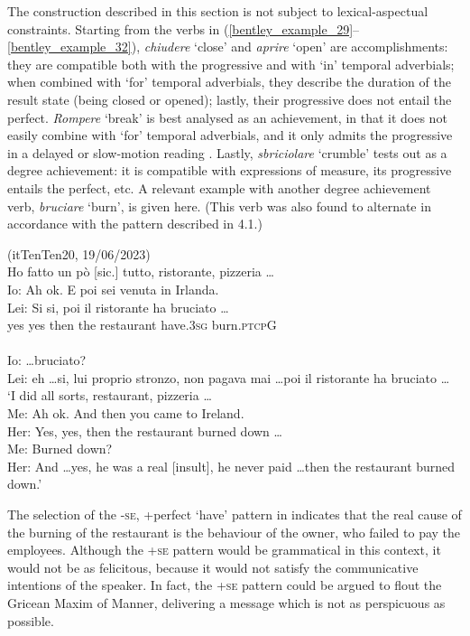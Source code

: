 \documentclass[output=paper,colorlinks,citecolor=brown
]{langscibook}
\begin{document}
The construction described in this section is not subject to lexical-aspectual constraints. Starting from the verbs in (\ref{bentley_example_29}--\ref{bentley_example_32}), \textit{chiudere} ‘close’ and \textit{aprire} ‘open’ are accomplishments: they are compatible both with the progressive and with ‘in’ temporal adverbials; when combined with ‘for’ temporal adverbials, they describe the duration of the result state (being closed or opened); lastly, their progressive does not entail the perfect. \textit{Rompere} ‘break’ is best analysed as an achievement, in that it does not easily combine with ‘for’ temporal adverbials, and it only admits the progressive in a delayed or slow-motion reading \citep{bertinetto2016tense,vivanco2021scalar}. Lastly, \textit{sbriciolare} ‘crumble’ tests out as a degree achievement: it is compatible with expressions of measure, its progressive entails the perfect, etc. A relevant example with another degree achievement verb, \textit{bruciare} ‘burn’, is given here. (This verb was also found to alternate in accordance with the pattern described in 4.1.)

\ea \label{bentley_example_34}(itTenTen20, 19/06/2023)\\
    Ho fatto un pò [sic.] tutto, ristorante, pizzeria \ldots  \\
    Io: Ah ok. E poi sei venuta in Irlanda. \\
    \gll Lei: Si			si,			poi			il		ristorante	ha						bruciato  \ldots    \\
    {} yes		yes		then		the	restaurant	have.3\textsc{sg}	burn.\textsc{ptcp}G {} \\ \\
    {Io:  \ldots bruciato?  }\\
    {Lei: eh \ldots si, lui proprio stronzo, non pagava mai \ldots  poi il ristorante ha bruciato \ldots } \\
    \glt 	‘I did all sorts, restaurant, pizzeria \ldots  \\
            Me:	Ah ok. And then you came to Ireland. \\
            Her:	Yes, yes, then the restaurant burned down \ldots  \\
            Me:	Burned down? \\
            		Her:	And \ldots  yes, he was a real [insult], he never paid \ldots  then the restaurant burned down.’
\z
   

The selection of the {-\textsc{se}, +perfect ‘have’} pattern in  indicates that the real cause of the burning of the restaurant is the behaviour of the owner, who failed to pay the employees. Although the +\textsc{se} pattern would be grammatical in this context, it would not be as felicitous, because it would not satisfy the communicative intentions of the speaker. In fact, the +\textsc{se} pattern could be argued to flout the Gricean Maxim of Manner, delivering a message which is not as perspicuous as possible.
\end{document}
